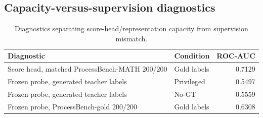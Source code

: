 \documentclass{article}
\begin{document}
\begin{table}[t]
\centering
\small
{}
\caption{Representative sequence-cluster bootstrap ROC-AUC gaps. Older
generated-baseline rows use 2{,}000 resamples; same-source and format-rerender
rows use 5{,}000 resamples. Full bootstrap tables for every pairwise comparison are included in the
anonymized supplementary material.}
\label{tab:mismatch-gaps}
\end{table}

\subsection{Capacity-versus-supervision diagnostics}
\label{app:probes}

\begin{table}[t]
\centering
\small
\begin{tabular}{llr}
\toprule
Diagnostic & Condition & ROC-AUC \\
\midrule
Score head, matched ProcessBench-MATH 200/200 & Gold labels & 0.7129 \\
Frozen probe, generated teacher labels & Privileged & 0.5497 \\
Frozen probe, generated teacher labels & No-GT & 0.5559 \\
Frozen probe, ProcessBench-gold 200/200 & Gold labels & 0.6308 \\
\bottomrule
\end{tabular}
\caption{Diagnostics separating score-head/representation capacity from
supervision mismatch.}
\label{tab:mismatch-probes}
\end{table}
\end{document}
